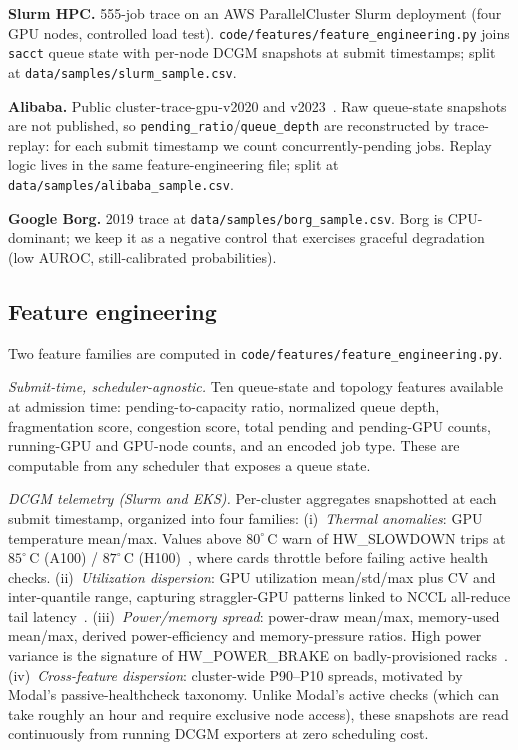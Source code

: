 \documentclass[conference]{IEEEtran}
\begin{document}
\textbf{Slurm HPC.} 555-job trace on an AWS ParallelCluster Slurm deployment (four GPU nodes, controlled load test). \texttt{code/features/feature\_engineering.py} joins \texttt{sacct} queue state with per-node DCGM snapshots at submit timestamps; split at \texttt{data/samples/slurm\_sample.csv}.

\textbf{Alibaba.} Public cluster-trace-gpu-v2020 and v2023~\cite{weng2022mlaas,alibaba-2023-fgd}. Raw queue-state snapshots are not published, so \texttt{pending\_ratio}/\texttt{queue\_depth} are reconstructed by trace-replay: for each submit timestamp we count concurrently-pending jobs. Replay logic lives in the same feature-engineering file; split at \texttt{data/samples/alibaba\_sample.csv}.

\textbf{Google Borg.} 2019 trace at \texttt{data/samples/borg\_sample.csv}. Borg is CPU-dominant; we keep it as a negative control that exercises graceful degradation (low AUROC, still-calibrated probabilities).

\subsection{Feature engineering}
\label{sec:features}
Two feature families are computed in \texttt{code/features/feature\_engineering.py}.

\emph{Submit-time, scheduler-agnostic.} Ten queue-state and topology features available at admission time: pending-to-capacity ratio, normalized queue depth, fragmentation score, congestion score, total pending and pending-GPU counts, running-GPU and GPU-node counts, and an encoded job type. These are computable from any scheduler that exposes a queue state.

\emph{DCGM telemetry (Slurm and EKS).} Per-cluster aggregates snapshotted at each submit timestamp, organized into four families:
(i)~\emph{Thermal anomalies}: GPU temperature mean/max. Values above $80^{\circ}$\,C warn of HW\_SLOWDOWN trips at $85^{\circ}$\,C (A100) / $87^{\circ}$\,C (H100)~\cite{llama3,modal2025}, where cards throttle before failing active health checks.
(ii)~\emph{Utilization dispersion}: GPU utilization mean/std/max plus CV and inter-quantile range, capturing straggler-GPU patterns linked to NCCL all-reduce tail latency~\cite{pindrop2026}.
(iii)~\emph{Power/memory spread}: power-draw mean/max, memory-used mean/max, derived power-efficiency and memory-pressure ratios. High power variance is the signature of HW\_POWER\_BRAKE on badly-provisioned racks~\cite{modal2025}.
(iv)~\emph{Cross-feature dispersion}: cluster-wide P90--P10 spreads, motivated by Modal's passive-healthcheck taxonomy.
Unlike Modal's active checks (which can take roughly an hour and require exclusive node access), these snapshots are read continuously from running DCGM exporters at zero scheduling cost.
\end{document}
